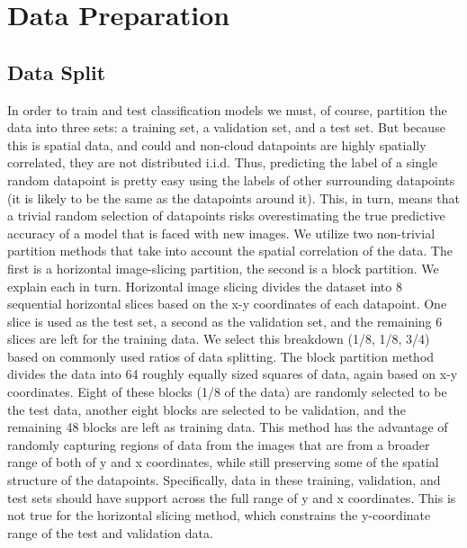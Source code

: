 \documentclass[12pt]{article}
\begin{document}
\section{Data Preparation}
\subsection{Data Split}
In order to train and test classification models we must, of course, partition the data into three sets: a training set, a validation set, and a test set. But because this is spatial data, and could and non-cloud datapoints are highly spatially correlated, they are not distributed i.i.d. Thus, predicting the label of a single random datapoint is pretty easy using the labels of other surrounding datapoints (it is likely to be the same as the datapoints around it). This, in turn, means that a trivial random selection of datapoints risks overestimating the true predictive accuracy of a model that is faced with new images. 
\newline
\newline
We utilize two non-trivial partition methods that take into account the spatial correlation of the data.  The first is a horizontal image-slicing partition, the second is a block partition.  We explain each in turn. 
\newline
\newline
Horizontal image slicing divides the dataset into 8 sequential horizontal slices based on the x-y coordinates of each datapoint. One slice is used as the test set, a second as the validation set, and the remaining 6 slices are left for the training data. We select this breakdown (1/8, 1/8, 3/4) based on commonly used ratios of data splitting. 
\newline
\newline
The block partition method divides the data into 64 roughly equally sized squares of data, again based on x-y coordinates. Eight of these blocks (1/8 of the data) are randomly selected to be the test data, another eight blocks are selected to be validation, and the remaining 48 blocks are left as training data. This method has the advantage of randomly capturing regions of data from the images that are from a broader range of both of y and x coordinates, while still preserving some of the spatial structure of the datapoints. Specifically, data in these training, validation, and test sets should have support across the full range of y and x coordinates. This is not true for the horizontal slicing method, which constrains the y-coordinate range of the test and validation data. 
\end{document}
